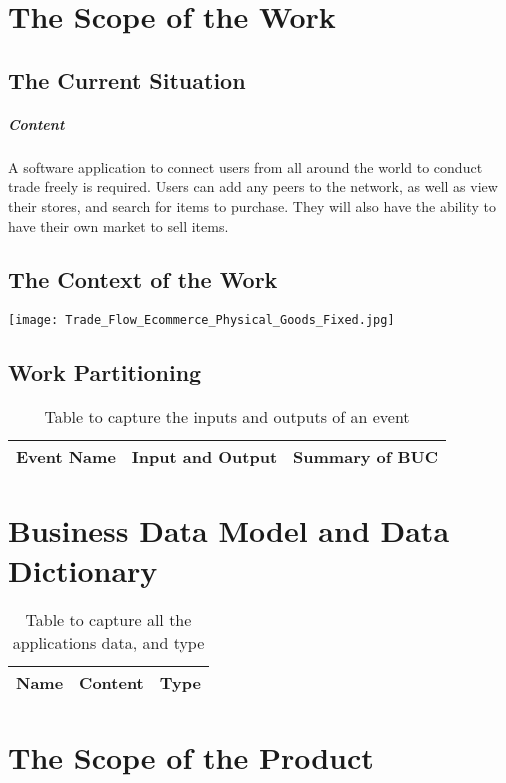 \documentclass{article}
\begin{document}
\section{The Scope of the Work}
\subsection{The Current Situation}
\subparagraph{Content}
A software application to connect users from all around the world to conduct trade freely is required. Users can add any peers to the network, as well as view their stores, and search for items to purchase. They will also have the ability to have their own market to sell items.

\subsection{The Context of the Work}
\texttt{[image: Trade\_Flow\_Ecommerce\_Physical\_Goods\_Fixed.jpg]}


\subsection{Work Partitioning}

\begin{table}[h!]
\centering
\begin{tabular}{||c c c ||}
 \hline
 \textbf {Event Name} & \textbf{Input and Output} & \textbf{Summary of BUC} \\ [0.5ex]
 \hline
\end{tabular}
\caption{Table to capture the inputs and outputs of an event}
\label{table:2}
\end{table}

\section{Business Data Model and Data Dictionary}

\begin{table}[h!]
\centering
\begin{tabular}{||c c c ||}
 \hline
 \textbf {Name} & \textbf{Content} & \textbf{Type} \\ [0.5ex]
 \hline
\end{tabular}
\caption{Table to capture all the applications data, and type}
\label{table:3}
\end{table}


\section{The Scope of the Product}
\end{document}
